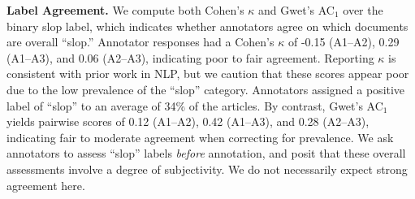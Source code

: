 \documentclass{article} %
\begin{document}
\begin{table}
\centering
{}
\caption{Agreement and label prevalence for ``slop'' codes.}
\label{tab:agreement-all}
\end{table}

\textbf{Label Agreement.} We compute both Cohen's $\kappa$ and Gwet's AC$_1$ over the binary slop label, which indicates whether annotators agree on which documents are overall ``slop.'' 
Annotator responses had a Cohen's $\kappa$ of -0.15 (A1--A2), 0.29 (A1--A3), and 0.06 (A2--A3), indicating poor to fair agreement. 
Reporting $\kappa$ is consistent with prior work in NLP, but we caution that these scores appear poor due to the low prevalence of the ``slop'' category. Annotators assigned a positive label of ``slop'' to an average of 34\% of the articles. 
By contrast, Gwet's AC$_1$ yields pairwise scores of 0.12 (A1--A2), 0.42 (A1--A3), and 0.28 (A2--A3), indicating fair to moderate agreement when correcting for prevalence. 
We ask annotators to assess ``slop'' labels \textit{before} annotation, and posit that these overall assessments involve a degree of subjectivity. 
We do not necessarily expect strong agreement here.
\end{document}

